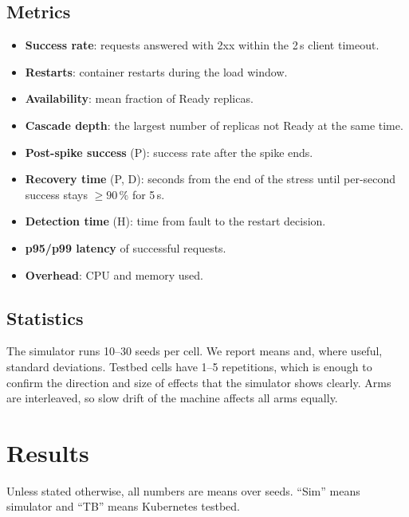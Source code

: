 \documentclass[conference]{IEEEtran}
\begin{document}
\subsection{Metrics}
\begin{itemize}
\item \textbf{Success rate}: requests answered with 2xx within the 2\,s
  client timeout.
\item \textbf{Restarts}: container restarts during the load window.
\item \textbf{Availability}: mean fraction of Ready replicas.
\item \textbf{Cascade depth}: the largest number of replicas not Ready
  at the same time.
\item \textbf{Post-spike success} (P): success rate after the spike ends.
\item \textbf{Recovery time} (P, D): seconds from the end of the stress
  until per-second success stays $\ge 90\,\%$ for 5\,s.
\item \textbf{Detection time} (H): time from fault to the restart
  decision.
\item \textbf{p95/p99 latency} of successful requests.
\item \textbf{Overhead}: CPU and memory used.
\end{itemize}

\subsection{Statistics}
The simulator runs 10--30 seeds per cell. We report means and, where
useful, standard deviations. Testbed cells have 1--5 repetitions, which
is enough to confirm the direction and size of effects that the
simulator shows clearly. Arms are interleaved, so slow drift of the
machine affects all arms equally.

\section{Results}
\label{sec:results}
Unless stated otherwise, all numbers are means over seeds. ``Sim'' means
simulator and ``TB'' means Kubernetes testbed.
\end{document}
